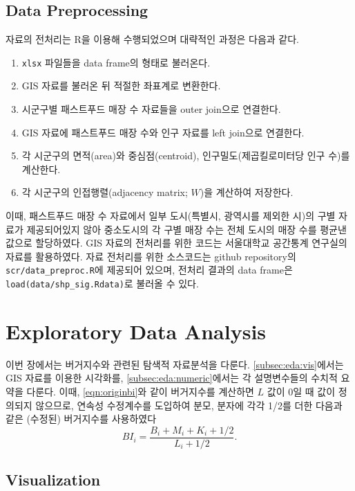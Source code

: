 \documentclass{scrartcl}
\begin{document}
\subsection{Data Preprocessing}\label{subsec:data:preproc}

자료의 전처리는 R을 이용해 수행되었으며 대략적인 과정은 다음과 같다. 
\begin{enumerate}
    \item \texttt{xlsx} 파일들을 data frame의 형태로 불러온다.
    \item GIS 자료를 불러온 뒤 적절한 좌표계로 변환한다.
    \item 시군구별 패스트푸드 매장 수 자료들을 outer join으로 연결한다.
    \item GIS 자료에 패스트푸드 매장 수와 인구 자료를 left join으로 연결한다. 
    \item 각 시군구의 면적(area)와 중심점(centroid), 인구밀도(제곱킬로미터당 인구 수)를 계산한다.
    \item 각 시군구의 인접행렬(adjacency matrix; $W$)을 계산하여 저장한다.
\end{enumerate}

이때, 패스트푸드 매장 수 자료에서 일부 도시(특별시, 광역시를 제외한 시)의 구별 자료가 제공되어있지 않아 중소도시의 각 구별 매장 수는 전체 도시의 매장 수를 평균낸 값으로 할당하였다. GIS 자료의 전처리를 위한 코드는 서울대학교 공간통계 연구실의 자료를 활용하였다. 자료 전처리를 위한 소스코드는 github repository의 \texttt{scr/data\_preproc.R}에 제공되어 있으며, 전처리 결과의 data frame은 \texttt{load(data/shp\_sig.Rdata)}로 불러올 수 있다.

\section{Exploratory Data Analysis}\label{sec:eda}

이번 장에서는 버거지수와 관련된 탐색적 자료분석을 다룬다. \autoref{subsec:eda:vis}에서는 GIS 자료를 이용한 시각화를, \autoref{subsec:eda:numeric}에서는 각 설명변수들의 수치적 요약을 다룬다. 이때, \autoref{eqn:originbi}와 같이 버거지수를 계산하면 $L$ 값이 0일 때 값이 정의되지 않으므로, 연속성 수정계수를 도입하여 분모, 분자에 각각 1/2를 더한 다음과 같은 (수정된) 버거지수를 사용하였다
\begin{equation}\label{eqn:bi}
    BI_i = \frac{B_i+M_i+K_i+1/2}{L_i+1/2}.
\end{equation}

\subsection{Visualization}\label{subsec:eda:vis}
\end{document}
